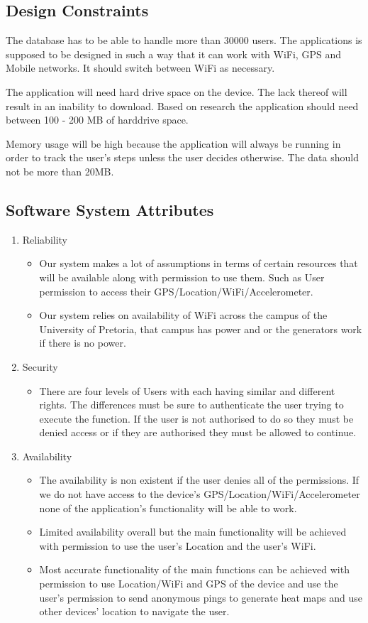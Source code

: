 \documentclass[11pt]{article}
\begin{document}
		\subsection{Design Constraints}
    		The database has to be able to handle more than 30000 users. The applications is supposed to be designed in such a way 			that it can work with WiFi, GPS and Mobile networks. It should switch between WiFi as necessary.

		    The application will need hard drive space on the device. The lack thereof will result in an inability to download. 			Based on research the application should need between 100 - 200 MB of harddrive space. 

		    Memory usage will be high because the application will always be running in order to track the user’s steps unless the 			user decides otherwise. The data should not be more than 20MB.

		\subsection{Software System Attributes}
			\begin{enumerate}
				\item Reliability 
					\begin{itemize}
						\item Our system makes a lot of assumptions in terms of certain resources that will be available along with permission to use them. Such as User permission to access their GPS/Location/WiFi/Accelerometer.
						\item Our system relies on availability of WiFi across the campus of the University of Pretoria, that campus has power and or the generators work if there is no power.
					\end{itemize}
				\item Security 
					\begin{itemize}
						\item There are four levels of Users with each having similar and different rights. The differences must be sure to authenticate the user trying to execute the function. If the user is not authorised to do so they must be denied access or if they are authorised they must be allowed to continue.
					\end{itemize}
				\item Availability
					\begin{itemize}
						\item The availability is non existent if the user denies all of the permissions. If we do not have access to the device's GPS/Location/WiFi/Accelerometer none of the application's functionality will be able to work.
						\item Limited availability overall but the main functionality will be achieved with permission to use the user's Location and the user's WiFi.
						\item Most accurate functionality of the main functions can be achieved with permission to use Location/WiFi and GPS of the device and use the user's permission to send anonymous pings to generate heat maps and use other devices' location to navigate the user.
					\end{itemize}
			\end{enumerate}
	
\end{document}
